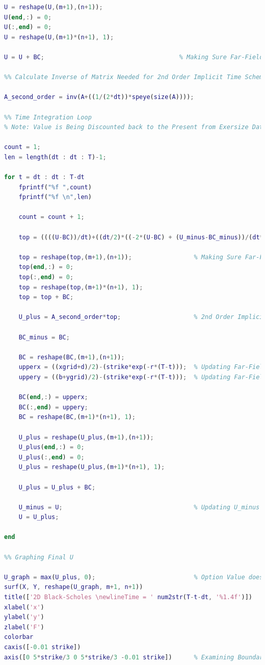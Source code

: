 \documentclass[12pt,letterpaper]{article}
\begin{document}
\begin{lstlisting}[language = Matlab]
U = reshape(U,(m+1),(n+1));
U(end,:) = 0;
U(:,end) = 0;
U = reshape(U,(m+1)*(n+1), 1);

U = U + BC;                                     % Making Sure Far-Field Boundaries Have Correct Value in Case of Rounding Error

%% Calculate Inverse of Matrix Needed for 2nd Order Implicit Time Scheme

A_second_order = inv(A+((1/(2*dt))*speye(size(A))));

%% Time Integration Loop
% Note: Value is Being Discounted back to the Present from Exersize Date

count = 1;
len = length(dt : dt : T)-1;

for t = dt : dt : T-dt 
    fprintf("%f ",count)
    fprintf("%f \n",len)

    count = count + 1;

    top = ((((U-BC))/dt)+((dt/2)*((-2*(U-BC) + (U_minus-BC_minus))/(dt*dt))) + BC); % Updating Implicit Scheme Vector

    top = reshape(top,(m+1),(n+1));                 % Making Sure Far-Field Boundaries Have Correct Value in Case of Rounding Error
    top(end,:) = 0;
    top(:,end) = 0;
    top = reshape(top,(m+1)*(n+1), 1);
    top = top + BC;

    U_plus = A_second_order*top;                    % 2nd Order Implicit Scheme for Next Time Step

    BC_minus = BC;

    BC = reshape(BC,(m+1),(n+1));
    upperx = ((xgrid+d)/2)-(strike*exp(-r*(T-t)));  % Updating Far-Field Boundary Conditions for X
    uppery = ((b+ygrid)/2)-(strike*exp(-r*(T-t)));  % Updating Far-Field Boundary Conditions for Y

    BC(end,:) = upperx;
    BC(:,end) = uppery;
    BC = reshape(BC,(m+1)*(n+1), 1);

    U_plus = reshape(U_plus,(m+1),(n+1));
    U_plus(end,:) = 0;
    U_plus(:,end) = 0;
    U_plus = reshape(U_plus,(m+1)*(n+1), 1);
    
    U_plus = U_plus + BC;

    U_minus = U;                                    % Updating U_minus and U for Next Time Step
    U = U_plus;

end

%% Graphing Final U

U_graph = max(U_plus, 0);                           % Option Value doesn't go below zero
surf(X, Y, reshape(U_graph, m+1, n+1))
title(['2D Black-Scholes \newlineTime = ' num2str(T-t-dt, '%1.4f')])
xlabel('x')
ylabel('y')
zlabel('F')
colorbar
caxis([-0.01 strike])
axis([0 5*strike/3 0 5*strike/3 -0.01 strike])      % Examining Boundary Up to 5*strike/3 as Done in Paper


\end{lstlisting}
\end{document}
